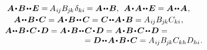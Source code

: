 \begin{equation}
\begin{array}{c}
\\[.2em]
%
\bm{A} \narrowdotp \bm{B} \narrowdotdotp \UnitDyad = \hspace{-0.16ex} A_{\hspace{.1ex}i\hspace{-0.1ex}j} B_{\hspace{-0.1ex}j\hspace{-0.1ex}k} \hspace{.2ex} \delta_{ki} \hspace{-0.1ex} = \bm{A} \narrowdotdotp \bm{B} ,
\:\:
\bm{A} \narrowdotp \bm{A} \narrowdotdotp \UnitDyad = \bm{A} \narrowdotdotp \bm{A}
\hspace{.12ex} ,
\\[.2em]
%
\bm{A} \narrowdotdotp \bm{B} \narrowdotp \bm{C} = \bm{A} \narrowdotp \bm{B} \narrowdotdotp \hspace{.1ex} \bm{C} = \hspace{.1ex} \bm{C} \narrowdotdotp \hspace{-0.1ex} \bm{A} \narrowdotp \bm{B} = A_{\hspace{.1ex}i\hspace{-0.1ex}j} B_{\hspace{-0.1ex}j\hspace{-0.1ex}k} C_{ki} \hspace{.1ex} ,
\\[.15em]
%
\bm{A} \hspace{-0.1ex}\narrowdotdotp \bm{B} \narrowdotp \bm{C} \narrowdotp \bm{D} = \bm{A} \narrowdotp \bm{B} \narrowdotdotp \bm{C} \narrowdotp \bm{D} = \bm{A} \narrowdotp \bm{B} \narrowdotp \bm{C} \narrowdotdotp \bm{D} = \hspace*{3em} \\
\hspace{11em} = \bm{D} \narrowdotdotp \bm{A} \narrowdotp \bm{B} \narrowdotp \bm{C} = A_{\hspace{.1ex}i\hspace{-0.1ex}j} B_{\hspace{-0.1ex}j\hspace{-0.1ex}k} C_{kh} D_{hi} \hspace{.1ex}.
\end{array}
\end{equation}
